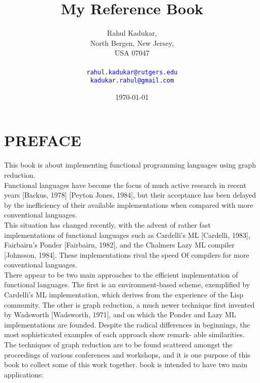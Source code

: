 \documentclass[11pt,a4paper]{book}
\begin{document}
\title{My Reference Book}
\author{
Rahul Kadukar, \\
North Bergen, New Jersey, \\
USA 07047 \\
\\
\texttt{\textcolor{blue}{rahul.kadukar@rutgers.edu}} \\
\texttt{\textcolor{blue}{kadukar.rahul@gmail.com}}
}
\date{\today}
\maketitle
\begingroup
\let\cleardoublepage\clearpage
\tableofcontents
\endgroup

\chapter*{PREFACE}
This book is about implementing functional programming languages using 
graph reduction.\\
 
Functional languages have become the focus of much active research in 
recent years [Backus, 1978] [Peyton Jones, 1984], but their acceptance has 
been delayed by the inefficiency of their available implementations when 
compared with more conventional languages.\\
 
This situation has changed recently, with the advent of rather fast 
implementations of functional languages such as Cardelli's ML [Cardelli, 1983], 
Fairbairn's Ponder [Fairbairn, 1982], and the Chalmers Lazy ML compiler 
[Johnsson, 1984]. These implementations rival the speed Of compilers for 
more conventional languages.\\
 
There appear to be two main approaches to the efficient implementation of 
functional languages. The first is an environment-based scheme, exemplified 
by Cardelli's ML implementation, which derives from the experience of the 
Lisp community. The other is graph reduction, a much newer technique first 
invented by Wadsworth [Wadsworth, 1971], and on which the Ponder and 
Lazy ML implementations are founded. Despite the radical differences in 
beginnings, the most sophisticated examples of each approach show remark- 
able similarities.\\
 
The techniques of graph reduction are to be found scattered amongst the 
proceedings of various conferences and workshops, and it is one purpose of 
this book to collect some of this work together. book is intended to have 
two main applications:
\end{document}
